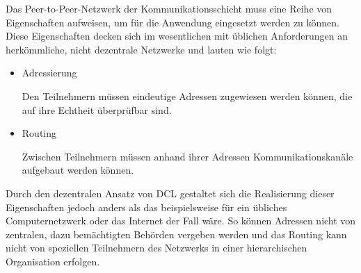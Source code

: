 
Das Peer-to-Peer-Netzwerk der Kommunikationsschicht muss eine Reihe von Eigenschaften aufweisen,
um für die Anwendung eingesetzt werden zu können. Diese Eigenschaften decken sich im wesentlichen mit
üblichen Anforderungen an herkömmliche, nicht dezentrale Netzwerke und lauten wie folgt:
\begin{itemize}
	\item Adressierung
	
		Den Teilnehmern müssen eindeutige Adressen zugewiesen werden können, die auf ihre Echtheit überprüfbar sind.
	
	
	\item Routing
		
		Zwischen Teilnehmern müssen anhand ihrer Adressen Kommunikationskanäle aufgebaut werden können.

\end{itemize}

Durch den dezentralen Ansatz von DCL gestaltet sich die Realisierung dieser Eigenschaften jedoch
anders als das beispielsweise für ein übliches Computernetzwerk oder das Internet der Fall wäre.
So können Adressen nicht von zentralen, dazu bemächtigten Behörden vergeben werden und das Routing
kann nicht von speziellen Teilnehmern des Netzwerks in einer hierarchischen Organisation erfolgen.

